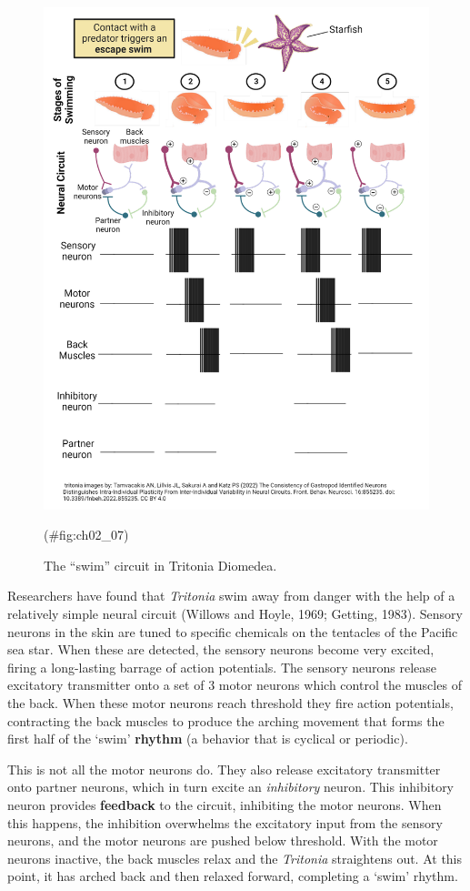 \documentclass[
]{book}
\begin{document}
\begin{figure}

{\centering \includegraphics[width=0.8\linewidth]{images/ch02/02_07} 

}

\caption{The “swim” circuit in Tritonia Diomedea.}(\#fig:ch02_07)
\end{figure}

Researchers have found that \emph{Tritonia} swim away from danger with the help of a relatively simple neural circuit (Willows and Hoyle, 1969; Getting, 1983). Sensory neurons in the skin are tuned to specific chemicals on the tentacles of the Pacific sea star. When these are detected, the sensory neurons become very excited, firing a long-lasting barrage of action potentials. The sensory neurons release excitatory transmitter onto a set of 3 motor neurons which control the muscles of the back. When these motor neurons reach threshold they fire action potentials, contracting the back muscles to produce the arching movement that forms the first half of the `swim' \textbf{rhythm }(a behavior that is cyclical or periodic).

This is not all the motor neurons do. They also release excitatory transmitter onto partner neurons, which in turn excite an \emph{inhibitory} neuron. This inhibitory neuron provides \textbf{feedback} to the circuit, inhibiting the motor neurons. When this happens, the inhibition overwhelms the excitatory input from the sensory neurons, and the motor neurons are pushed below threshold. With the motor neurons inactive, the back muscles relax and the \emph{Tritonia} straightens out. At this point, it has arched back and then relaxed forward, completing a `swim' rhythm.
\end{document}

